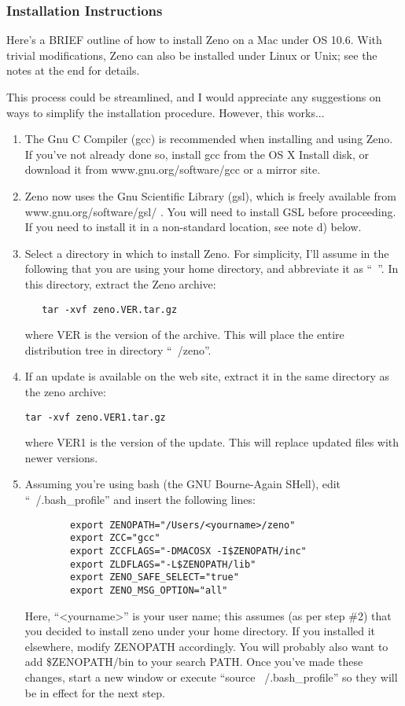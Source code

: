 \documentclass[11pt,letterpaper]{article}
\begin{document}
\subsubsection{Installation Instructions}

Here's a BRIEF outline of how to install Zeno on a Mac under OS 10.6.  With trivial modifications, Zeno can also be installed under Linux or Unix; see the notes at the end for details.

This process could be streamlined, and I would appreciate any suggestions on ways to simplify the installation procedure.  However, this works...

\begin{enumerate}
  \item{The Gnu C Compiler (gcc) is recommended when installing and using
Zeno.  If you've not already done so, install gcc from the OS X Install
disk, or download it from www.gnu.org/software/gcc or a mirror site.}
  \item{Zeno now uses the Gnu Scientific Library (gsl), which is freely
available from www.gnu.org/software/gsl/ .  You will need to install GSL
before proceeding.  If you need to install it in a non-standard
location, see note d) below.}
  \item{Select a directory in which to install Zeno.  For simplicity, I'll
assume in the following that you are using your home directory, and
abbreviate it as ``~''.  In this directory, extract the Zeno archive: \\
  \begin{verbatim}
   tar -xvf zeno.VER.tar.gz
  \end{verbatim}
where VER is the version of the archive.  This will place the entire
distribution tree in directory ``~/zeno''.}
\item{If an update is available on the web site, extract it in the same
directory as the zeno archive:
  \begin{verbatim}
tar -xvf zeno.VER1.tar.gz
  \end{verbatim}
where VER1 is the version of the update.  This will replace updated
files with newer versions.}
  \item{Assuming you're using bash (the GNU Bourne-Again SHell), edit ``~/.bash\_profile'' and insert the following lines:
\begin{verbatim}
        export ZENOPATH="/Users/<yourname>/zeno"
        export ZCC="gcc"
        export ZCCFLAGS="-DMACOSX -I$ZENOPATH/inc"
        export ZLDFLAGS="-L$ZENOPATH/lib"
        export ZENO_SAFE_SELECT="true"
        export ZENO_MSG_OPTION="all"
\end{verbatim}
Here, ``<yourname>'' is your user name; this assumes (as per step \#2) that you decided to install zeno under your home directory.  If you installed it elsewhere, modify ZENOPATH accordingly.  You will probably also want to add \$ZENOPATH/bin to your search PATH.  Once you've made these changes, start a new window or execute ``source ~/.bash\_profile'' so they will be in effect for the next step.

}
\end{enumerate}
\end{document}
